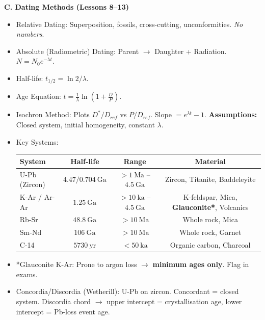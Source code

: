 \documentclass[11pt]{article}
\newcommand{\cle}[1]{{\popxbold\color{popdark}#1}}
\begin{document}
\begin{aretenir}
\textbf{C. Dating Methods (Lessons 8--13)}
\begin{itemize}
    \item \cle{Relative Dating}: Superposition, fossils, cross-cutting, unconformities. \emph{No numbers}.
    \item \cle{Absolute (Radiometric) Dating}: Parent $\rightarrow$ Daughter + Radiation. $N = N_0 e^{-\lambda t}$.
    \item \cle{Half-life}: $t_{1/2} = \ln 2 / \lambda$.
    \item \cle{Age Equation}: $t = \frac{1}{\lambda} \ln\left(1 + \frac{D}{P}\right)$.
    \item \cle{Isochron Method}: Plots $D^*/D_{ref}$ vs $P/D_{ref}$. Slope $= e^{\lambda t} - 1$. \textbf{Assumptions:} Closed system, initial homogeneity, constant $\lambda$.
    \item \cle{Key Systems}:
    \begin{center}
    \begin{tabular}{lccc}
    \textbf{System} & \textbf{Half-life} & \textbf{Range} & \textbf{Material} \\ \hline
    U-Pb (Zircon) & $4.47 / 0.704\ \mathrm{Ga}$ & $>1\ \mathrm{Ma}$ -- $4.5\ \mathrm{Ga}$ & Zircon, Titanite, Baddeleyite \\
    K-Ar / Ar-Ar & $1.25\ \mathrm{Ga}$ & $>10\ \mathrm{ka}$ -- $4.5\ \mathrm{Ga}$ & K-feldspar, Mica, \textbf{Glauconite*}, Volcanics \\
    Rb-Sr & $48.8\ \mathrm{Ga}$ & $>10\ \mathrm{Ma}$ & Whole rock, Mica \\
    Sm-Nd & $106\ \mathrm{Ga}$ & $>10\ \mathrm{Ma}$ & Whole rock, Garnet \\
    C-14 & $5730\ \mathrm{yr}$ & $<50\ \mathrm{ka}$ & Organic carbon, Charcoal \\
    \end{tabular}
    \end{center}
    \item \cle{*Glauconite K-Ar}: Prone to argon loss $\rightarrow$ \textbf{minimum ages only}. Flag in exams.
    \item \cle{Concordia/Discordia} (Wetherill): U-Pb on zircon. Concordant = closed system. Discordia chord $\rightarrow$ upper intercept = crystallisation age, lower intercept = Pb-loss event age.
\end{itemize}


\end{aretenir}
\end{document}
